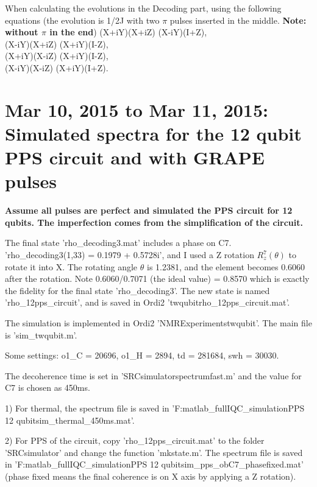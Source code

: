 When calculating the evolutions in the Decoding part, using the following equations (the evolution is 1/2J with two $\pi$ pulses inserted in the middle. \textbf{Note: without $\pi$ in the end})
\bea
(X+iY)\otimes(X+iZ) \longrightarrow (X-iY)\otimes(I+Z), \\ \nonumber
(X-iY)\otimes(X+iZ) \longrightarrow (X+iY)\otimes(I-Z), \\ \nonumber
(X+iY)\otimes(X-iZ) \longrightarrow (X+iY)\otimes(I-Z), \\ \nonumber
(X-iY)\otimes(X-iZ) \longrightarrow (X+iY)\otimes(I+Z).
\eea

\clearpage
\section{Mar 10, 2015 to Mar 11, 2015: Simulated spectra for the 12 qubit PPS circuit and with GRAPE pulses}

{}

\textbf{Assume all pulses are perfect and simulated the PPS circuit for 12 qubits. The imperfection comes from the simplification of the circuit.}

The final state 'rho\_decoding3.mat' includes a phase on C7. 'rho\_decoding3(1,33) = 0.1979 + 0.5728i', and I used a Z rotation $R_z^7(\theta)$ to rotate it into X. The rotating angle $\theta$ is 1.2381, and the element becomes 0.6060 after the rotation. Note 0.6060/0.7071 (the ideal value) = 0.8570 which is exactly the fidelity for the final state 'rho\_decoding3'. The new state is named 'rho\_12pps\_circuit', and is saved in Ordi2 '\dir twqubit\dir rho\_12pps\_circuit.mat'.

The simulation is implemented in Ordi2 '\dir NMR\dir Experiments\dir twqubit'. The main file is 'sim\_twqubit.m'.

Some settings:
o1\_C = 20696, o1\_H = 2894, td = 281684, swh = 30030.

The decoherence time is set in '\dir SRC\dir simulator\dir spectrumfast.m' and the value for C7 is chosen as 450ms.

1) For thermal, the spectrum file is saved in 'F:\dir matlab\_full\dir IQC\_simulation\dir PPS 12 qubit\dir sim\_thermal\_450ms.mat'.

2) For PPS of the circuit, copy 'rho\_12pps\_circuit.mat' to the folder '\dir SRC\dir simulator\dir' and change the function 'mkstate.m'. The spectrum file is saved in 'F:\dir matlab\_full\dir IQC\_simulation\dir PPS 12 qubit\dir sim\_pps\_obC7\_phasefixed.mat' (phase fixed means the final coherence is on X axis by applying a Z rotation).

